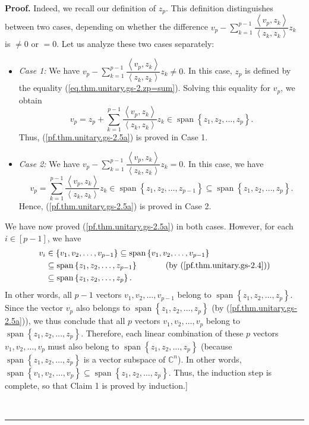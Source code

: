 \documentclass[numbers=enddot,12pt,final,onecolumn,notitlepage]{scrartcl}%
\numberwithin{exer}{subsection}
\theoremstyle{definition}
\newenvironment{proof}[1][Proof]{\noindent\textbf{#1.} }{\ \rule{0.5em}{0.5em}}
\let\sumnonlimits\sum
\renewcommand{\sum}{\sumnonlimits\limits}
\begin{document}
\begin{proof}
Indeed, we recall our definition of $z_{p}$. This definition distinguishes
between two cases, depending on whether the difference $v_{p}-\sum_{k=1}%
^{p-1}\dfrac{\left\langle v_{p},z_{k}\right\rangle }{\left\langle z_{k}%
,z_{k}\right\rangle }z_{k}$ is $\neq0$ or $=0$. Let us analyze these two cases separately:

\begin{itemize}
\item \textit{Case 1:} We have $v_{p}-\sum_{k=1}^{p-1}\dfrac{\left\langle
v_{p},z_{k}\right\rangle }{\left\langle z_{k},z_{k}\right\rangle }z_{k}\neq0$.
In this case, $z_{p}$ is defined by the equality
(\ref{eq.thm.unitary.gs-2.zp=sum}). Solving this equality for $v_{p}$, we
obtain%
\[
v_{p}=z_{p}+\sum_{k=1}^{p-1}\dfrac{\left\langle v_{p},z_{k}\right\rangle
}{\left\langle z_{k},z_{k}\right\rangle }z_{k}\in\operatorname*{span}\left\{
z_{1},z_{2},\ldots,z_{p}\right\}  .
\]
Thus, (\ref{pf.thm.unitary.gs-2.5a}) is proved in Case 1.

\item \textit{Case 2:} We have $v_{p}-\sum_{k=1}^{p-1}\dfrac{\left\langle
v_{p},z_{k}\right\rangle }{\left\langle z_{k},z_{k}\right\rangle }z_{k}=0$. In
this case, we have%
\[
v_{p}=\sum_{k=1}^{p-1}\dfrac{\left\langle v_{p},z_{k}\right\rangle
}{\left\langle z_{k},z_{k}\right\rangle }z_{k}\in\operatorname*{span}\left\{
z_{1},z_{2},\ldots,z_{p-1}\right\}  \subseteq\operatorname*{span}\left\{
z_{1},z_{2},\ldots,z_{p}\right\}  .
\]
Hence, (\ref{pf.thm.unitary.gs-2.5a}) is proved in Case 2.
\end{itemize}

We have now proved (\ref{pf.thm.unitary.gs-2.5a}) in both cases. However, for
each $i\in\left[  p-1\right]  $, we have%
\begin{align*}
v_{i}  &  \in\left\{  v_{1},v_{2},\ldots,v_{p-1}\right\}  \subseteq
\operatorname*{span}\left\{  v_{1},v_{2},\ldots,v_{p-1}\right\} \\
&  \subseteq\operatorname*{span}\left\{  z_{1},z_{2},\ldots,z_{p-1}\right\}
\ \ \ \ \ \ \ \ \ \ \left(  \text{by (\ref{pf.thm.unitary.gs-2.4})}\right) \\
&  \subseteq\operatorname*{span}\left\{  z_{1},z_{2},\ldots,z_{p}\right\}  .
\end{align*}
In other words, all $p-1$ vectors $v_{1},v_{2},\ldots,v_{p-1}$ belong to
$\operatorname*{span}\left\{  z_{1},z_{2},\ldots,z_{p}\right\}  $. Since the
vector $v_{p}$ also belongs to $\operatorname*{span}\left\{  z_{1}%
,z_{2},\ldots,z_{p}\right\}  $ (by (\ref{pf.thm.unitary.gs-2.5a})), we thus
conclude that all $p$ vectors $v_{1},v_{2},\ldots,v_{p}$ belong to
$\operatorname*{span}\left\{  z_{1},z_{2},\ldots,z_{p}\right\}  $. Therefore,
each linear combination of these $p$ vectors $v_{1},v_{2},\ldots,v_{p}$ must
also belong to $\operatorname*{span}\left\{  z_{1},z_{2},\ldots,z_{p}\right\}
$ (because $\operatorname*{span}\left\{  z_{1},z_{2},\ldots,z_{p}\right\}  $
is a vector subspace of $\mathbb{C}^{n}$). In other words,
$\operatorname*{span}\left\{  v_{1},v_{2},\ldots,v_{p}\right\}  \subseteq
\operatorname*{span}\left\{  z_{1},z_{2},\ldots,z_{p}\right\}  $. Thus, the
induction step is complete, so that Claim 1 is proved by induction.] \medskip


\end{proof}
\end{document}
